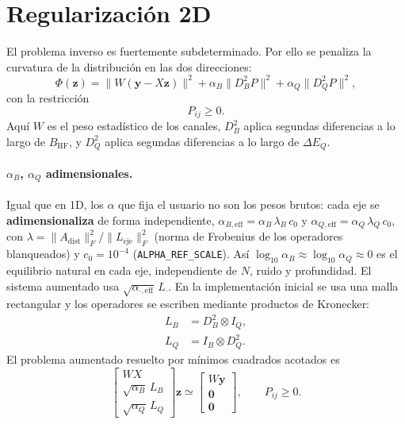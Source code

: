 \documentclass[11pt,a4paper]{article}
\newcommand{\BHF}{B_{\mathrm{HF}}}
\newcommand{\DEQ}{\Delta E_Q}
\begin{document}
\section{Regularización 2D}

El problema inverso es fuertemente subdeterminado. Por ello se penaliza la
curvatura de la distribución en las dos direcciones:
\begin{equation}
  \Phi(\bm z)=\|W(\bm y-X\bm z)\|^2
  +\alpha_B\|D_B^2 P\|^2
  +\alpha_Q\|D_Q^2 P\|^2,
\end{equation}
con la restricción
\begin{equation}
  P_{ij}\ge 0.
\end{equation}
Aquí $W$ es el peso estadístico de los canales, $D_B^2$ aplica segundas
diferencias a lo largo de $\BHF$, y $D_Q^2$ aplica segundas diferencias a lo
largo de $\DEQ$.

\paragraph{$\alpha_B$, $\alpha_Q$ adimensionales.} Igual que en 1D, los $\alpha$
que fija el usuario no son los pesos brutos: cada eje se \textbf{adimensionaliza}
de forma independiente,
$\alpha_{B,\text{eff}}=\alpha_B\,\lambda_B\,c_0$ y
$\alpha_{Q,\text{eff}}=\alpha_Q\,\lambda_Q\,c_0$, con
$\lambda=\lVert A_{\text{dist}}\rVert_F^2/\lVert L_{\text{eje}}\rVert_F^2$
(norma de Frobenius de los operadores blanqueados) y $c_0=10^{-4}$
(\texttt{\small ALPHA\_REF\_SCALE}). Así $\log_{10}\alpha_B\approx\log_{10}\alpha_Q\approx0$
es el equilibrio natural en cada eje, independiente de $N$, ruido y profundidad.
El sistema aumentado usa $\sqrt{\alpha_{\cdot,\text{eff}}}\,L_\cdot$. En la implementación inicial se usa una malla rectangular y los
operadores se escriben mediante productos de Kronecker:
\begin{align}
  L_B &= D_B^2\otimes I_Q,\\
  L_Q &= I_B\otimes D_Q^2.
\end{align}
El problema aumentado resuelto por mínimos cuadrados acotados es
\begin{equation}
  \begin{bmatrix}
    WX\\
    \sqrt{\alpha_B}\,L_B\\
    \sqrt{\alpha_Q}\,L_Q
  \end{bmatrix}\bm z
  \simeq
  \begin{bmatrix}
    W\bm y\\
    \bm 0\\
    \bm 0
  \end{bmatrix},
  \qquad P_{ij}\ge 0.
\end{equation}
\end{document}
